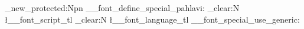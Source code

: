 
\ExplSyntaxOn

\cs_new_protected:Npn \__font_define_special_pahlavi:
  {
    \tl_clear:N \l__font_script_tl
    \tl_clear:N \l__font_language_tl
    \__font_special_use_generic:
  }

\ExplSyntaxOff
